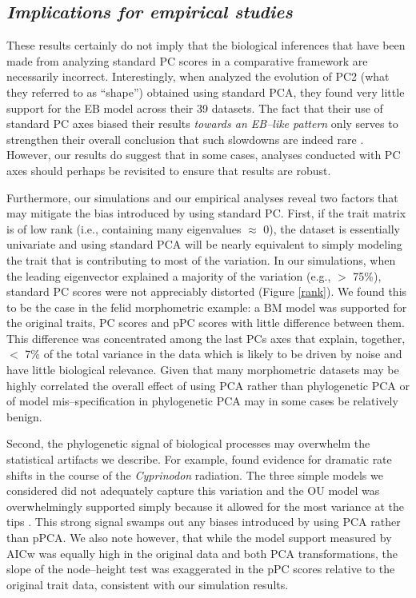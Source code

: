 \documentclass[a4paper,11pt]{article}
\begin{document}
\subsection{\emph{Implications for empirical studies}}
These results certainly do not imply that the biological inferences that have been made from analyzing standard PC scores in a comparative framework are necessarily incorrect. Interestingly, when \citet{Harmon2010} analyzed the evolution of PC2 (what they referred to as ``shape'') obtained using standard PCA, they found very little support for the EB model across their 39 datasets. The fact that their use of standard PC axes biased their results \emph{towards an EB--like pattern} only serves to strengthen their overall conclusion that such slowdowns are indeed rare \citep[but see][]{SlaterPennell}. However, our results do suggest that in some cases, analyses conducted with PC axes should perhaps be revisited to ensure that results are robust.

Furthermore, our simulations and our empirical analyses reveal two factors that may mitigate the bias introduced by using standard PC. First, if the trait matrix is of low rank (i.e., containing many eigenvalues $\approx$ 0), the dataset is essentially univariate and using standard PCA will be nearly equivalent to simply modeling the trait that is contributing to most of the variation. In our simulations, when the leading eigenvector explained a majority of the variation (e.g., $>$ 75\%), standard PC scores were not appreciably distorted (Figure \ref{rank}). We found this to be the case in the felid morphometric example: a BM model was supported for the original traits, PC scores and pPC scores with little difference between them. This difference was concentrated among the last PCs axes that explain, together, $<$ 7\% of the total variance in the data which is likely to be driven by noise and have little biological relevance. Given that many morphometric datasets may be highly correlated the overall effect of using PCA rather than phylogenetic PCA or of model mis--specification in phylogenetic PCA may in some cases be relatively benign.

Second, the phylogenetic signal of biological processes may overwhelm the statistical artifacts we describe. For example, \citet{Martin2011} found evidence for dramatic rate shifts in the course of the \emph{Cyprinodon} radiation. The three simple models we considered did not adequately capture this variation and the OU model was overwhelmingly supported simply because it allowed for the most variance at the tips \citep{Pennell-adequacy}. This strong signal swamps out any biases introduced by using PCA rather than pPCA. We also note however, that while the model support measured by AICw was equally high in the original data and both PCA transformations, the slope of the node--height test was exaggerated in the pPC scores relative to the original trait data, consistent with our simulation results.
\end{document}
